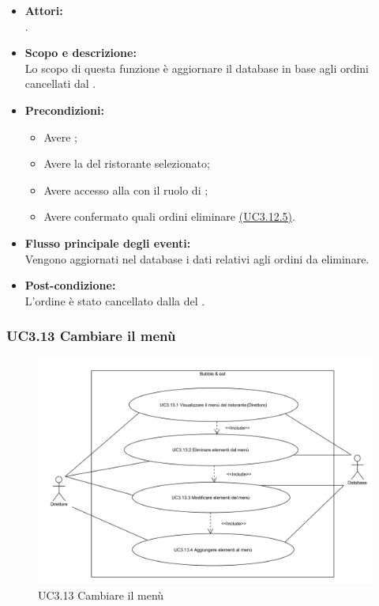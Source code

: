 \begin{itemize}
	\item \textbf{Attori:}
	\\.
	\item \textbf{Scopo e descrizione:} 
	\\Lo scopo di questa funzione è aggiornare il database in base agli ordini cancellati dal .
	\item \textbf{Precondizioni:}
	\begin{itemize}
		\item Avere ;
		\item Avere la  del ristorante selezionato;
		\item Avere accesso alla  con il ruolo di ;
		\item Avere confermato quali ordini eliminare \hyperref[UC3.12.5]{(UC3.12.5)}.
	\end{itemize}
	\item \textbf{Flusso principale degli eventi:}
	\\Vengono aggiornati nel database i dati relativi agli ordini da eliminare.
	\item \textbf{Post-condizione:}
	\\L'ordine è stato cancellato dalla  del .
\end{itemize}

\subsubsection{UC3.13 Cambiare il menù} \label{UC3.13}

\begin{figure}[H]
	\centering
	\includegraphics[width=15cm]{../../documenti/AnalisiDeiRequisiti/Diagrammi_img/uc3_13.png}
	\caption{UC3.13 Cambiare il menù}
\end{figure}

